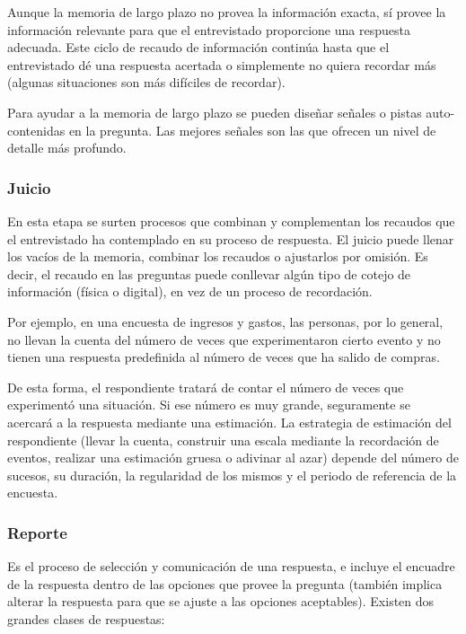 \documentclass[
  10pt,
  spanish,
]{book}
\begin{document}
Aunque la memoria de largo plazo no provea la información exacta, sí provee la información relevante para que el entrevistado proporcione una respuesta adecuada. Este ciclo de recaudo de información continúa hasta que el entrevistado dé una respuesta acertada o simplemente no quiera recordar más (algunas situaciones son más difíciles de recordar).

Para ayudar a la memoria de largo plazo se pueden diseñar señales o pistas auto-contenidas en la pregunta. Las mejores señales son las que ofrecen un nivel de detalle más profundo.

\hypertarget{juicio}{%
\subsubsection*{Juicio}\label{juicio}}

En esta etapa se surten procesos que combinan y complementan los recaudos que el entrevistado ha contemplado en su proceso de respuesta. El juicio puede llenar los vacíos de la memoria, combinar los recaudos o ajustarlos por omisión. Es decir, el recaudo en las preguntas puede conllevar algún tipo de cotejo de información (física o digital), en vez de un proceso de recordación.

Por ejemplo, en una encuesta de ingresos y gastos, las personas, por lo general, no llevan la cuenta del número de veces que experimentaron cierto evento y no tienen una respuesta predefinida al número de veces que ha salido de compras.

De esta forma, el respondiente tratará de contar el número de veces que experimentó una situación. Si ese número es muy grande, seguramente se acercará a la respuesta mediante una estimación. La estrategia de estimación del respondiente (llevar la cuenta, construir una escala mediante la recordación de eventos, realizar una estimación gruesa o adivinar al azar) depende del número de sucesos, su duración, la regularidad de los mismos y el periodo de referencia de la encuesta.

\hypertarget{reporte}{%
\subsubsection*{Reporte}\label{reporte}}

Es el proceso de selección y comunicación de una respuesta, e incluye el encuadre de la respuesta dentro de las opciones que provee la pregunta (también implica alterar la respuesta para que se ajuste a las opciones aceptables). Existen dos grandes clases de respuestas:
\end{document}
